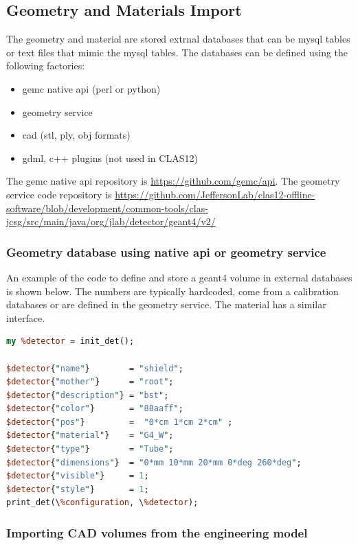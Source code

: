 \subsection{Geometry and Materials Import}

The geometry and material are stored extrnal databases that can be mysql tables or text files that mimic the mysql tables.
The databases can be defined using the following factories:

\begin{itemize}
	\item gemc native api (perl or python)
	\item geometry service
	\item cad (stl, ply, obj formats)
	\item gdml, c++ plugins (not used in CLAS12)
\end{itemize}

The gemc native api repository is \url{https://github.com/gemc/api}. The geometry service code repository is
\url{https://github.com/JeffersonLab/clas12-offline-software/blob/development/common-tools/clas-jcsg/src/main/java/org/jlab/detector/geant4/v2/}


\subsubsection{Geometry database using native api or geometry service}

An example of the code to define and store a geant4 volume in external databases is shown below. The
numbers are typically hardcoded, come from a calibration databases or are defined in the geometry service. The material
has a similar interface.

\begin{lstlisting}[language=Perl]
my %detector = init_det();

$detector{"name"}        = "shield";
$detector{"mother"}      = "root";
$detector{"description"} = "bst";
$detector{"color"}       = "88aaff";
$detector{"pos"}         =  "0*cm 1*cm 2*cm" ;
$detector{"material"}    = "G4_W";
$detector{"type"}        = "Tube";
$detector{"dimensions"}  = "0*mm 10*mm 20*mm 0*deg 260*deg";
$detector{"visible"}     = 1;
$detector{"style"}       = 1;
print_det(\%configuration, \%detector);

\end{lstlisting}


\subsubsection{Importing CAD volumes from the engineering model}

